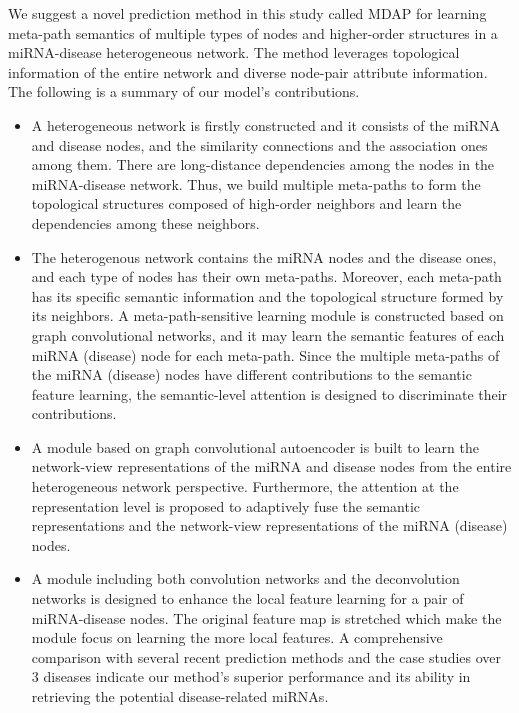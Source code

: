 \documentclass[journal,twoside,web]{ieeecolor}
\begin{document}
We suggest a novel prediction method in this study called MDAP for learning meta-path semantics of multiple types of nodes and higher-order structures in a miRNA-disease heterogeneous network. The method leverages topological information of the entire network and diverse node-pair attribute information. The following is a summary of our model's contributions.

\begin{itemize}
   \item A heterogeneous network is firstly constructed and it consists of the miRNA and disease nodes, and the similarity connections and the association ones among them. There are long-distance dependencies among the nodes in the miRNA-disease network. Thus, we build multiple meta-paths to form the topological structures composed of high-order neighbors and learn the dependencies among these neighbors.
	\item The heterogenous network contains the miRNA nodes and the disease ones, and each type of nodes has their own meta-paths. Moreover, each meta-path has its specific semantic information and the topological structure formed by its neighbors. A meta-path-sensitive learning module is constructed based on graph convolutional networks, and it may learn the semantic features of each miRNA (disease) node for each meta-path. Since the multiple meta-paths of the miRNA (disease) nodes have different contributions to the semantic feature learning, the semantic-level attention is designed to discriminate their contributions.
	\item A module based on graph convolutional autoencoder is built to learn the network-view representations of the miRNA and disease nodes from the entire heterogeneous network perspective. Furthermore, the attention at the representation level is proposed to adaptively fuse the semantic representations and the network-view representations of the miRNA (disease) nodes.
	\item A module including both convolution networks and the deconvolution networks is designed to enhance the local feature learning for a pair of miRNA-disease nodes. The original feature map is stretched which make the module focus on learning the more local features. A comprehensive comparison with several recent prediction methods and the case studies over 3 diseases indicate our method's superior performance and its ability in retrieving the potential disease-related miRNAs.
\end{itemize}
\end{document}
